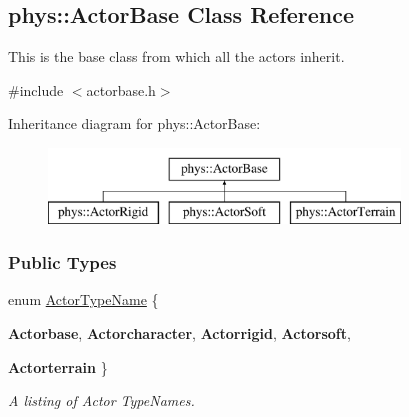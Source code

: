 \hypertarget{classphys_1_1ActorBase}{
\subsection{phys::ActorBase Class Reference}
\label{d8/d0f/classphys_1_1ActorBase}
}


This is the base class from which all the actors inherit.  




{\ttfamily \#include $<$actorbase.h$>$}

Inheritance diagram for phys::ActorBase:\begin{figure}[H]
\begin{center}
\leavevmode
\includegraphics[height=2.000000cm]{d8/d0f/classphys_1_1ActorBase}
\end{center}
\end{figure}
\subsubsection*{Public Types}
\begin{DoxyCompactItemize}
\item 
enum \hyperlink{classphys_1_1ActorBase_aff3a7c464e8ce82576073f8f891434b7}{ActorTypeName} \{ \par
{\bfseries Actorbase}, 
{\bfseries Actorcharacter}, 
{\bfseries Actorrigid}, 
{\bfseries Actorsoft}, 
\par
{\bfseries Actorterrain}
 \}
\begin{DoxyCompactList}\small\item\em A listing of Actor TypeNames. \item\end{DoxyCompactList}\end{DoxyCompactItemize}
